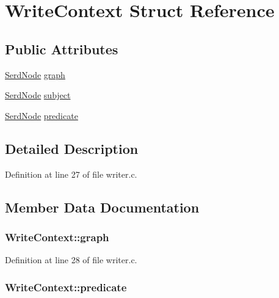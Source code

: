 \hypertarget{struct_write_context}{}\section{Write\+Context Struct Reference}
\label{struct_write_context}
\subsection*{Public Attributes}
\begin{DoxyCompactItemize}
\item 
\hyperlink{struct_serd_node}{Serd\+Node} \hyperlink{struct_write_context_a2d109c77586c02ab2fe63deda66d5f97}{graph}
\item 
\hyperlink{struct_serd_node}{Serd\+Node} \hyperlink{struct_write_context_a2b2d587c9e3a63827cb6d40e18c1981f}{subject}
\item 
\hyperlink{struct_serd_node}{Serd\+Node} \hyperlink{struct_write_context_a5888c184de5d37d5a7984b1ba1e0e3a3}{predicate}
\end{DoxyCompactItemize}


\subsection{Detailed Description}


Definition at line 27 of file writer.\+c.



\subsection{Member Data Documentation}
\subsubsection[{\texorpdfstring{graph}{graph}}]{ Write\+Context\+::graph}\hypertarget{struct_write_context_a2d109c77586c02ab2fe63deda66d5f97}{}\label{struct_write_context_a2d109c77586c02ab2fe63deda66d5f97}


Definition at line 28 of file writer.\+c.

\subsubsection[{\texorpdfstring{predicate}{predicate}}]{ Write\+Context\+::predicate}\hypertarget{struct_write_context_a5888c184de5d37d5a7984b1ba1e0e3a3}{}\label{struct_write_context_a5888c184de5d37d5a7984b1ba1e0e3a3}


